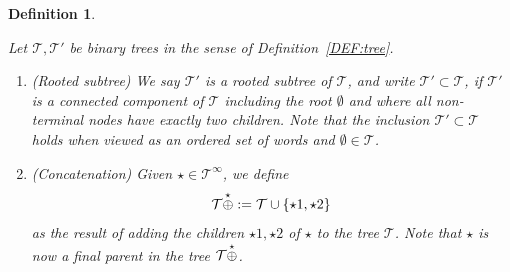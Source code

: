 \documentclass[%
11pt,  reqno]{amsart}
\makeatletter
\newcommand{\5}{\textup{V}}
\newtheorem{definition}[theorem]{Definition}
\theoremstyle{remark}
\newcommand{\TT}{\mathcal{T}}
\def\<#1>{\csname MH@symb@#1\endcsname}
\numberwithin{equation}{section}
\numberwithin{theorem}{section}
\makeatother
\begin{document}
\begin{definition}%
\label{DEF:tree3}
\rm

Let $\TT, \TT'$ be binary trees in the sense of Definition~\ref{DEF:tree}. 


\begin{enumerate}


\item[(i)] (Rooted subtree) We say $\TT'$ is a \textit{rooted subtree} of $\TT$, 
and write $\TT' \subset \TT$, if $\TT'$ is a connected component of $\TT$ including the root $\emptyset$ and where all non-terminal nodes have exactly two children. 
Note that the inclusion $\TT'\subset \TT$ holds when viewed as an ordered set of words and $\emptyset\in\TT$. 




\smallskip
\item[(ii)] (Concatenation) 
Given $ \star \in \TT^\infty$, we define
$$
\TT \overset{\star}{\oplus} \<1>
: = \TT \cup \{\star1, \star2\}
$$
as the result of adding the children $\star1,\star2$ of $\star$ to the tree $\TT$. 
Note that $\star$ is now a final parent in the tree $\TT \overset{\star}{\oplus} \<1>$. 





\end{enumerate}
\end{definition}
\end{document}

